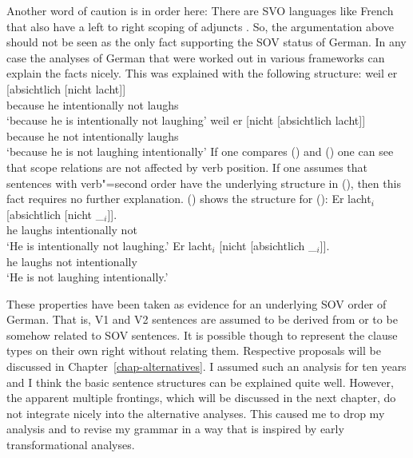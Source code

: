 \begin{enumerate}
{Another word of caution is in order here: There are SVO languages like French that also have a left
to right scoping of adjuncts \citep[--161]{BGK2004a-u}. So, the argumentation above should not be seen as the only
fact supporting the SOV status of German. In any case the analyses of German that were
worked out in various frameworks can explain the facts nicely.
}
This was explained with the following structure:
\eal
\label{bsp-absichtlich-nicht-anal}
\ex 
\gll weil er [absichtlich [nicht lacht]]\\
	 because he \spacebr{}intentionally \spacebr{}not laughs\\
\glt `because he is intentionally not laughing'
\ex 
\gll weil er [nicht [absichtlich lacht]]\\
     because he \spacebr{}not \spacebr{}intentionally laughs\\
\glt `because he is not laughing intentionally'
\zl
If one compares () and () one can see that scope relations are not affected by verb
position. If one assumes that sentences with verb"=second order have the underlying structure in
(), then this fact requires no further explanation. () shows the structure for ():
\eal
\label{bsp-absichtlich-nicht-anal-v1}
\ex 
\gll Er lacht$_i$ [absichtlich [nicht \_$_i$]].\\
     he laughs \spacebr{}intentionally \spacebr{}not\\
\glt `He is intentionally not laughing.'
\ex 
\gll Er lacht$_i$  [nicht [absichtlich \_$_i$]].\\
     he laughs \spacebr{}not \spacebr{}intentionally\\
\glt `He is not laughing intentionally.'
\zl{}
\nocite{Hoehle88a,Hoehle97a}
\end{enumerate}

These properties have been taken as evidence for an underlying SOV order of German. That is, V1 and
V2 sentences are assumed to be derived from or to be somehow related to SOV sentences. It is
possible though to represent the clause types on their own right without relating them. Respective
proposals will be discussed in Chapter~\ref{chap-alternatives}. I assumed such an analysis for ten
years and I think the basic sentence structures can be explained quite well. However, the apparent
multiple frontings, which will be discussed in the next chapter, do not integrate nicely into the
alternative analyses. This caused me to drop my analysis and to revise my grammar in a way that is
inspired by early transformational analyses.

